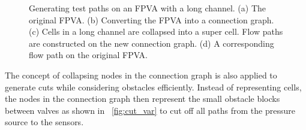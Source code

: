 \begin{figure}
{\figurefontsize
\centering

\caption{Generating test paths on an FPVA with a long channel. (a) The original FPVA. (b) Converting the FPVA into a connection graph. (c) Cells in a long channel are collapsed into a super cell. Flow paths are constructed on the new connection graph. (d) A corresponding flow path on the original FPVA.}
\label{fig:super_cell}
}
\end{figure}

The concept of collapsing nodes in the connection graph
is also applied to generate cuts while considering obstacles 
efficiently.  Instead of representing cells, 
the nodes in the connection graph then represent the small obstacle blocks between valves
as shown in \figname~\ref{fig:cut_var} to cut off all paths from the pressure
source to the sensors. 


